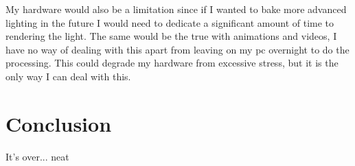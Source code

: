 \documentclass{article}
\newcommand{\parBr}{\vspace{5mm}}%
\begin{document}
\parBr

My hardware would also be a limitation since if I wanted to bake more advanced lighting in the future I would need to dedicate a significant amount of time to rendering the light. The same would be the true with animations and videos, I have no way of dealing with this apart from leaving on my pc overnight to do the processing. This could degrade my hardware from excessive stress, but it is the only way I can deal with this.

\section{Conclusion}
It's over... neat

\newpage
\printbibliography
\end{document}
